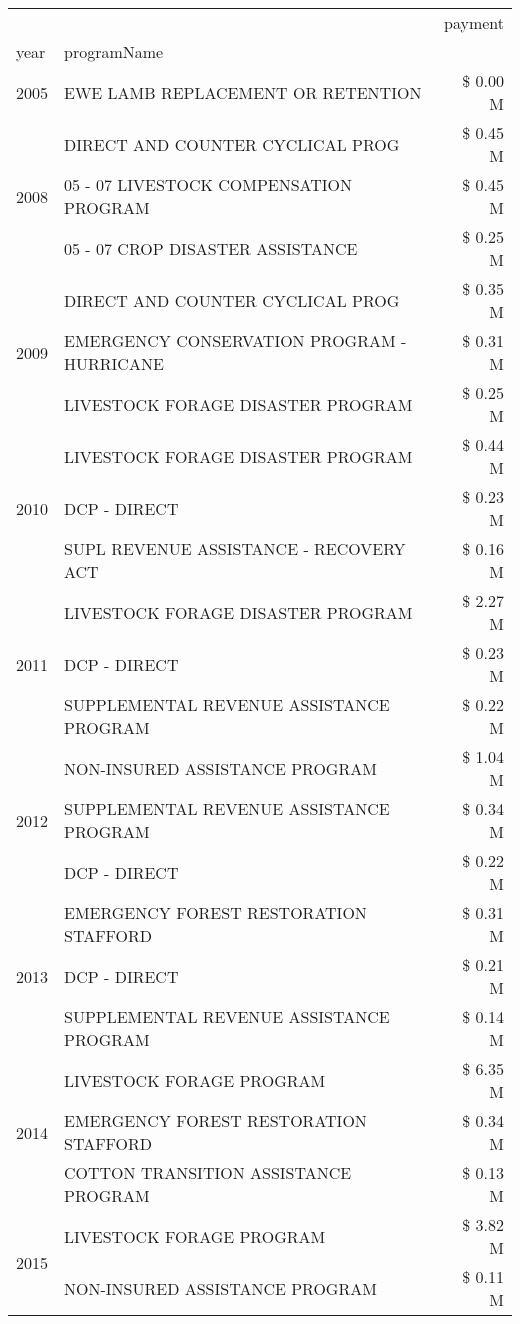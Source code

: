 \begin{tabular}{llr}
\toprule
 &  & payment \\
year & programName &  \\
\midrule
2005 & EWE LAMB REPLACEMENT OR RETENTION & \$ 0.00 M \\
\cline{1-3}
\multirow[t]{3}{*}{2008} & DIRECT AND COUNTER CYCLICAL PROG & \$ 0.45 M \\
 & 05 - 07 LIVESTOCK COMPENSATION PROGRAM & \$ 0.45 M \\
 & 05 - 07 CROP DISASTER ASSISTANCE & \$ 0.25 M \\
\cline{1-3}
\multirow[t]{3}{*}{2009} & DIRECT AND COUNTER CYCLICAL PROG & \$ 0.35 M \\
 & EMERGENCY CONSERVATION PROGRAM - HURRICANE & \$ 0.31 M \\
 & LIVESTOCK FORAGE DISASTER  PROGRAM & \$ 0.25 M \\
\cline{1-3}
\multirow[t]{3}{*}{2010} & LIVESTOCK FORAGE DISASTER PROGRAM & \$ 0.44 M \\
 & DCP - DIRECT & \$ 0.23 M \\
 & SUPL REVENUE ASSISTANCE - RECOVERY ACT & \$ 0.16 M \\
\cline{1-3}
\multirow[t]{3}{*}{2011} & LIVESTOCK FORAGE DISASTER PROGRAM & \$ 2.27 M \\
 & DCP - DIRECT & \$ 0.23 M \\
 & SUPPLEMENTAL REVENUE ASSISTANCE PROGRAM & \$ 0.22 M \\
\cline{1-3}
\multirow[t]{3}{*}{2012} & NON-INSURED ASSISTANCE PROGRAM & \$ 1.04 M \\
 & SUPPLEMENTAL REVENUE ASSISTANCE PROGRAM & \$ 0.34 M \\
 & DCP - DIRECT & \$ 0.22 M \\
\cline{1-3}
\multirow[t]{3}{*}{2013} & EMERGENCY FOREST RESTORATION STAFFORD & \$ 0.31 M \\
 & DCP - DIRECT & \$ 0.21 M \\
 & SUPPLEMENTAL REVENUE ASSISTANCE PROGRAM & \$ 0.14 M \\
\cline{1-3}
\multirow[t]{3}{*}{2014} & LIVESTOCK FORAGE PROGRAM & \$ 6.35 M \\
 & EMERGENCY FOREST RESTORATION STAFFORD & \$ 0.34 M \\
 & COTTON TRANSITION ASSISTANCE PROGRAM & \$ 0.13 M \\
\cline{1-3}
\multirow[t]{3}{*}{2015} & LIVESTOCK FORAGE PROGRAM & \$ 3.82 M \\
 & NON-INSURED ASSISTANCE PROGRAM & \$ 0.11 M \\

\end{tabular}
